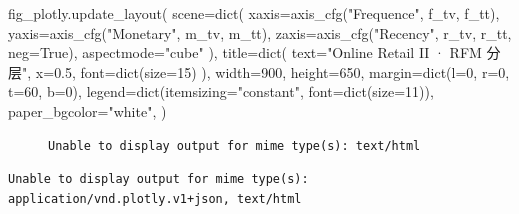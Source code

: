 \documentclass[
]{ctexart}
\newenvironment{Shaded}{\begin{snugshade}}{\end{snugshade}}
\newcommand{\BuiltInTok}[1]{\textcolor[rgb]{0.00,0.23,0.31}{#1}}
\newcommand{\DecValTok}[1]{\textcolor[rgb]{0.68,0.00,0.00}{#1}}
\newcommand{\FloatTok}[1]{\textcolor[rgb]{0.68,0.00,0.00}{#1}}
\newcommand{\NormalTok}[1]{\textcolor[rgb]{0.00,0.23,0.31}{#1}}
\newcommand{\OperatorTok}[1]{\textcolor[rgb]{0.37,0.37,0.37}{#1}}
\newcommand{\StringTok}[1]{\textcolor[rgb]{0.13,0.47,0.30}{#1}}
\newcommand{\VariableTok}[1]{\textcolor[rgb]{0.07,0.07,0.07}{#1}}
\begin{document}
\begin{Shaded}
\begin{Highlighting}[]
\NormalTok{fig\_plotly.update\_layout(}
\NormalTok{    scene}\OperatorTok{=}\BuiltInTok{dict}\NormalTok{(}
\NormalTok{        xaxis}\OperatorTok{=}\NormalTok{axis\_cfg(}\StringTok{"Frequence"}\NormalTok{, f\_tv, f\_tt), }
\NormalTok{        yaxis}\OperatorTok{=}\NormalTok{axis\_cfg(}\StringTok{"Monetary"}\NormalTok{, m\_tv, m\_tt), }
\NormalTok{        zaxis}\OperatorTok{=}\NormalTok{axis\_cfg(}\StringTok{"Recency"}\NormalTok{, r\_tv, r\_tt, neg}\OperatorTok{=}\VariableTok{True}\NormalTok{), }
\NormalTok{        aspectmode}\OperatorTok{=}\StringTok{"cube"}
\NormalTok{    ),}
\NormalTok{    title}\OperatorTok{=}\BuiltInTok{dict}\NormalTok{(}
\NormalTok{        text}\OperatorTok{=}\StringTok{"Online Retail II · RFM 分层"}\NormalTok{, }
\NormalTok{        x}\OperatorTok{=}\FloatTok{0.5}\NormalTok{, font}\OperatorTok{=}\BuiltInTok{dict}\NormalTok{(size}\OperatorTok{=}\DecValTok{15}\NormalTok{)}
\NormalTok{    ),}
\NormalTok{    width}\OperatorTok{=}\DecValTok{900}\NormalTok{, }
\NormalTok{    height}\OperatorTok{=}\DecValTok{650}\NormalTok{, }
\NormalTok{    margin}\OperatorTok{=}\BuiltInTok{dict}\NormalTok{(l}\OperatorTok{=}\DecValTok{0}\NormalTok{, r}\OperatorTok{=}\DecValTok{0}\NormalTok{, t}\OperatorTok{=}\DecValTok{60}\NormalTok{, b}\OperatorTok{=}\DecValTok{0}\NormalTok{),}
\NormalTok{    legend}\OperatorTok{=}\BuiltInTok{dict}\NormalTok{(itemsizing}\OperatorTok{=}\StringTok{"constant"}\NormalTok{, font}\OperatorTok{=}\BuiltInTok{dict}\NormalTok{(size}\OperatorTok{=}\DecValTok{11}\NormalTok{)),}
\NormalTok{    paper\_bgcolor}\OperatorTok{=}\StringTok{"white"}\NormalTok{,}
\NormalTok{)}
\end{Highlighting}
\end{Shaded}

\begin{figure}[H]

\begin{verbatim}
Unable to display output for mime type(s): text/html
\end{verbatim}

\end{figure}

\begin{verbatim}
Unable to display output for mime type(s): application/vnd.plotly.v1+json, text/html
\end{verbatim}
\end{document}
